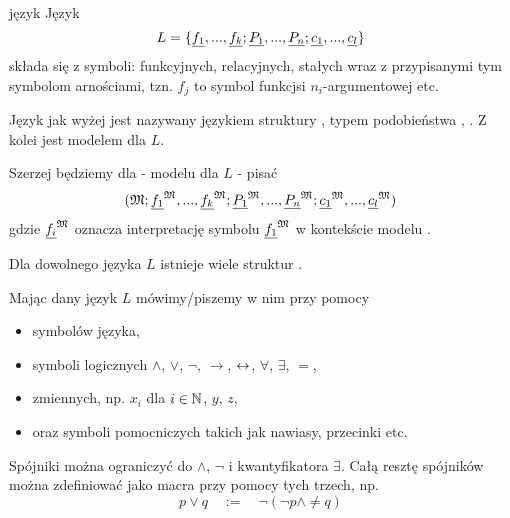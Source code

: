 \begin{definition}{język}{}
  Język
  $$L=\{\underline{f_1},...,\underline{f_k};\underline{P_1},..., \underline{P_n}; \underline{c_1},...,\underline{c_l}\}$$
  składa się z symboli: funkcyjnych, relacyjnych, stałych wraz z przypisanymi tym symbolom arnościami, tzn. $f_j$ to symbol funkcjsi $n_i$-argumentowej etc.
\end{definition}

Język jak wyżej jest nazywany językiem struktury \Mm{}, typem podobieństwa \Mm{}, . Z kolei \Mm{} jest modelem dla $L$.

Szerzej będziemy dla \Mm{} - modelu dla $L$ - pisać
$$(\mathfrak{M}; \underline{f_1}^{\mathfrak{M}}, ..., \underline{f_k}^{\mathfrak{M}}; \underline{P_1}^{\mathfrak{M}},...,\underline{P_n}^{\mathfrak{M}}; \underline{c_1}^{\mathfrak{M}},...,\underline{c_l}^{\mathfrak{M}})$$
gdzie $\underline{f_i}^{\mathfrak{M}}$ oznacza interpretację symbolu $\underline{f_1}^{\mathfrak{M}}$ w kontekście modelu \Mm.

\begin{remark}{}{}
  Dla dowolnego języka $L$ istnieje wiele struktur \Mm.
\end{remark}

Mając dany język $L$ mówimy/piszemy w nim przy pomocy
\begin{itemize}
  \item symbolów języka,
  \item symboli logicznych $\land$, $\lor$, $\neg$, $\to$, $\leftrightarrow$, $\forall$, $\exists$, $=$,
  \item zmiennych, np. $x_i$ dla $i\in \mathbb{N}$, $y$, $z$,
  \item oraz symboli pomocniczych takich jak nawiasy, przecinki etc.
\end{itemize}

\begin{remark}{}{}
  Spójniki można ograniczyć do $\land$, $\neg$ i kwantyfikatora $\exists$. Całą resztę spójników można zdefiniować jako macra przy pomocy tych trzech, np.
  $$p\lor q\quad :=\quad \neg(\neg p\land \neq q)$$
\end{remark}





